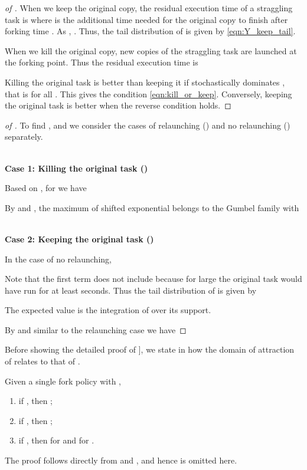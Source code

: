 \begin{proof}[of ]
When we keep the original copy, the residual execution time of a straggling task is 
where  is the additional time needed for the original copy to finish after forking time . As , . Thus, the tail distribution of  is given by \eqref{eqn:Y_keep_tail}. 

When we kill the original copy,  new copies of the straggling task are launched at the forking point. Thus the residual execution time is

Killing the original task is better than keeping it if  stochastically dominates , that is  for all . This gives the condition \eqref{eqn:kill_or_keep}. Conversely, keeping the original task is better when the reverse condition holds.
\end{proof}

\begin{proof}[of ]


To find ,  and   we consider the cases of relaunching () and no relaunching () separately. 

~\\
\textbf{Case 1: Killing the original task ()}

Based on , for  we have

By  and , the maximum of shifted exponential belongs to the Gumbel family with


~\\
\textbf{Case 2: Keeping the original task ()}
\label{sec:shifted_exp_no_relaunching}

In the case of no relaunching,

Note that the first term does not include  because for large  the original task would have run for at least  seconds. Thus the tail distribution of  is given by


The expected value  is the integration of  over its support.


By  and  similar to the relaunching case we have

\end{proof}



Before showing the detailed proof of ], 
we state in  how the domain of attraction of  relates to that of . 

\begin{lem}
    \label{lem:DA_FY}
    Given a single fork policy  with , 
    \begin{enumerate}
        \item if , then ;
        \item if , then ;
        \item if , then  for  and  for .
    \end{enumerate}
\end{lem}
The proof follows directly from  and , and hence is omitted here. 


